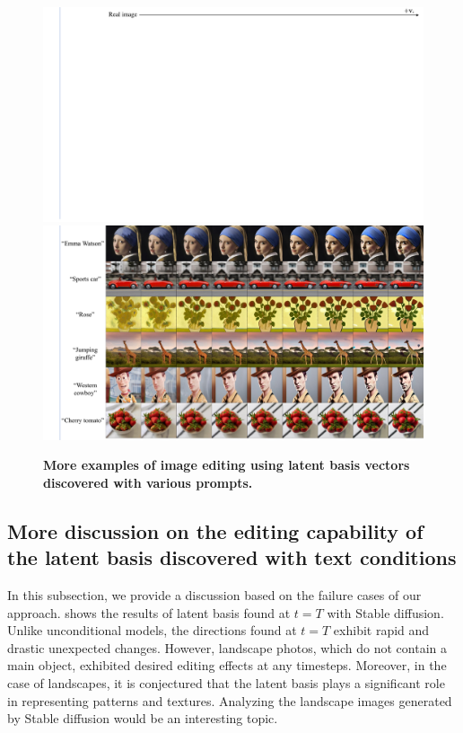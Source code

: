 \clearpage

\begin{figure}[!h]
    \centering
    \includegraphics[width=1.0\linewidth]{figure/top.pdf}
    \includegraphics[width=1.0\linewidth]{figure/stable_text_3.pdf}
    \caption{
    \textbf{More examples of image editing using latent basis vectors discovered with various prompts.} }
    \label{fig:stable_text_more2}
\end{figure}

\subsection{More discussion on the editing capability of the latent basis discovered with text conditions}
\label{appen:more_discussion}

In this subsection, we provide a discussion based on the failure cases of our approach.  shows the results of latent basis found at $t=T$ with Stable diffusion. Unlike unconditional models, the directions found at $t=T$ exhibit rapid and drastic unexpected changes. 
However, landscape photos, which do not contain a main object, exhibited desired editing effects at any timesteps.
Moreover, in the case of landscapes, it is conjectured that the latent basis plays a significant role in representing patterns and textures. 
Analyzing the landscape images generated by Stable diffusion would be an interesting topic.

